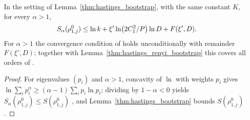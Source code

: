 \begin{lemma}
    \label{thm:hastings_renyi_bootstrap_above_one}
    \leanok
    In the setting of Lemma~\ref{thm:hastings_bootstrap}, with the same
    constant $K$, for every $\alpha>1$,
    \begin{align}
        S_\alpha(\rho^0_{1,j})\le\ln k+\xi'\ln\bigl(2C_1^2/P\bigr)\ln D+F(\xi',D).
        \notag
    \end{align}
    For $\alpha>1$ the convergence condition of
    \cite[line 406]{Hastings2007AreaLaw} holds unconditionally with remainder
    $F(\xi',D)$; together with Lemma~\ref{thm:hastings_renyi_bootstrap} this
    covers all orders of \cite[lines 392--410]{Hastings2007AreaLaw}.
\end{lemma}
\begin{proof}\leanok
    For eigenvalues $(p_i)$ and $\alpha>1$, concavity of $\ln$ with weights
    $p_i$ gives $\ln\sum_ip_i^\alpha\ge(\alpha-1)\sum_ip_i\ln p_i$; dividing by
    $1-\alpha<0$ yields $S_\alpha(\rho^0_{1,j})\le S(\rho^0_{1,j})$
    \cite[``Rényi entropy of order above one'']{QICLean2026Blueprint}, and
    Lemma~\ref{thm:hastings_bootstrap} bounds $S(\rho^0_{1,j})$.
\end{proof}


